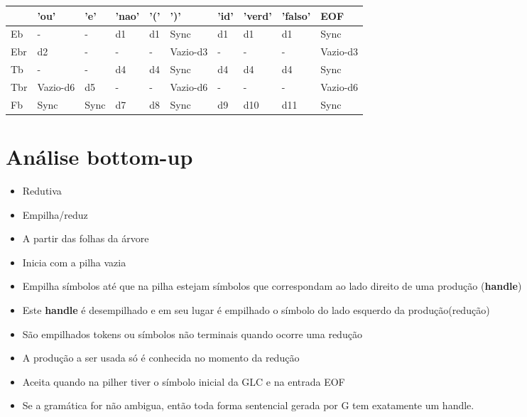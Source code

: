 \documentclass[11pt]{article}
\begin{document}
\begin{center}
\begin{tabular}{l|lllllllll|}
\hline
 & 'ou' & 'e' & 'nao' & '(' & ')' & 'id' & 'verd' & 'falso' & EOF\\
\hline
\hline
Eb & - & - & d1 & d1 & Sync & d1 & d1 & d1 & Sync\\
\hline
Ebr & d2 & - & - & - & Vazio-d3 & - & - & - & Vazio-d3\\
\hline
Tb & - & - & d4 & d4 & Sync & d4 & d4 & d4 & Sync\\
\hline
Tbr & Vazio-d6 & d5 & - & - & Vazio-d6 & - & - & - & Vazio-d6\\
\hline
Fb & Sync & Sync & d7 & d8 & Sync & d9 & d10 & d11 & Sync\\
\hline
\end{tabular}
\end{center}

\section{Análise bottom-up}
\label{sec:org018276e}
\begin{itemize}
\item Redutiva
\item Empilha/reduz
\item A partir das folhas da árvore
\item Inicia com a pilha vazia
\item Empilha símbolos até que na pilha estejam símbolos que
correspondam ao lado direito de uma produção (\textbf{handle})
\item Este \textbf{handle} é desempilhado e em seu lugar é empilhado o símbolo
do lado esquerdo da produção(redução)
\item São empilhados tokens ou símbolos não terminais quando ocorre uma
redução
\item A produção a ser usada só é conhecida no momento da redução
\item Aceita quando na pilher tiver o símbolo inicial da GLC e na
entrada EOF
\item Se a gramática for não ambigua, então toda forma sentencial gerada
por G tem exatamente um handle.
\end{itemize}
\end{document}
